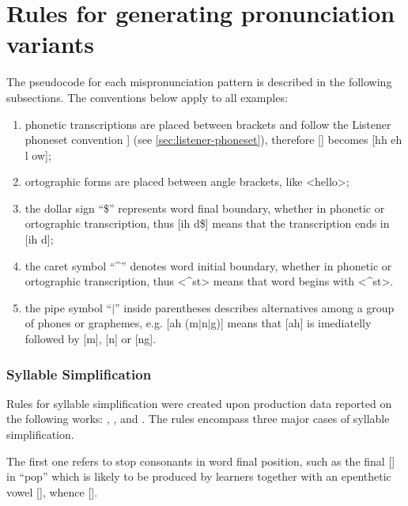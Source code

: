 \chapter{Rules for generating pronunciation variants}\label{ch:rules}


The pseudocode for each mispronunciation pattern is described in the following subsections. The conventions below apply to all examples:

\begin{enumerate}
 \item phonetic transcriptions are placed between brackets and follow the Listener phoneset convention ]
 (see \autoref{sec:listener-phoneset}), therefore [] becomes [hh eh l ow];
 \item ortographic forms are placed between angle brackets, like <hello>;
 \item the dollar sign ``\$'' represents word final boundary, whether in phonetic or ortographic transcription, 
 thus [ih d\$] means that the transcription ends in [ih d];
 \item the caret symbol ``\textasciicircum'' denotes word initial boundary, whether in phonetic or 
 ortographic transcription, thus <\textasciicircum st> means that word begins with <\textasciicircum st>.
 \item the pipe symbol ``$\vert$'' inside parentheses describes alternatives among a group of phones or 
 graphemes, e.g. [ah (m$\vert$n$\vert$g)] means that [ah] is imediatelly followed by [m], [n] or [ng].
\end{enumerate}

\subsection{Syllable Simplification}
Rules for syllable simplification were created upon production data reported on the following works:
\citeauthor{Cardoso2011} \citep{Cardoso2011}, \citeauthor{Silveira2012} \citep{Silveira2012}
\citeauthor{Rauber2004} \citep{Rauber2004}, and \citeauthor{Rebello2006} \citep{Rebello2006}. The rules
encompass three major cases of syllable simplification. 

The first one refers to stop consonants in word 
final position, such as the final [] in ``pop'' which is likely to be produced by learners
together with an epenthetic vowel [], whence []. 

